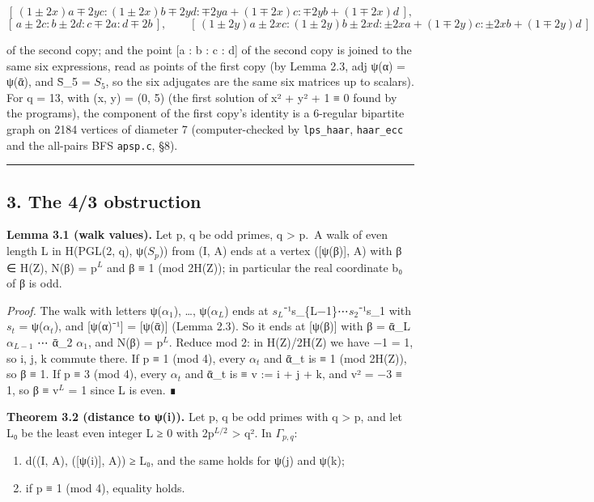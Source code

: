\documentclass[
  10pt,
]{article}
\providecommand{\tightlist}{%
  \setlength{\itemsep}{0pt}\setlength{\parskip}{0pt}}
\begin{document}
\[[\,(1 \pm 2x)a \mp 2yc : (1 \pm 2x)b \mp 2yd : \mp 2ya + (1 \mp 2x)c : \mp 2yb + (1 \mp 2x)d\,],\]
\[[\,a \pm 2c : b \pm 2d : c \mp 2a : d \mp 2b\,],\qquad
[\,(1 \pm 2y)a \pm 2xc : (1 \pm 2y)b \pm 2xd : \pm 2xa + (1 \mp 2y)c : \pm 2xb + (1 \mp 2y)d\,]\]

of the second copy; and the point {[}a : b : c : d{]} of the second copy
is joined to the same six expressions, read as points of the first copy
(by Lemma 2.3, adj ψ(α) = ψ(ᾱ), and S̄\_5 = \(S_{5}\), so the six
adjugates are the same six matrices up to scalars). For q = 13, with (x,
y) = (0, 5) (the first solution of x² + y² + 1 ≡ 0 found by the
programs), the component of the first copy's identity is a 6-regular
bipartite graph on 2184 vertices of diameter 7 (computer-checked by
\texttt{lps\_haar}, \texttt{haar\_ecc} and the all-pairs BFS
\texttt{apsp.c}, §8).

\begin{center}\rule{0.5\linewidth}{0.5pt}\end{center}

\hypertarget{the-43-obstruction}{%
\subsection{3. The 4/3 obstruction}\label{the-43-obstruction}}

\textbf{Lemma 3.1 (walk values).} Let p, q be odd primes, q
\textgreater{} p.~A walk of even length L in H(PGL(2, q), ψ(\(S_{p}\)))
from (I, A) ends at a vertex ({[}ψ(β){]}, A) with β ∈ H(Z), N(β) =
p\(^{L}\) and β ≡ 1 (mod 2H(Z)); in particular the real coordinate b₀ of
β is odd.

\emph{Proof.} The walk with letters ψ(\(α_{1}\)), \ldots, ψ(\(α_{L}\))
ends at \(s_{L}\)⁻¹s\_\{L−1\}⋯\(s_{2}\)⁻¹s\_1 with \(s_{t}\) =
ψ(\(α_{t}\)), and {[}ψ(α)⁻¹{]} = {[}ψ(ᾱ){]} (Lemma 2.3). So it ends at
{[}ψ(β){]} with β = ᾱ\_L \(α_{L−1}\) ⋯ ᾱ\_2 \(α_{1}\), and N(β) =
p\(^{L}\). Reduce mod 2: in H(Z)/2H(Z) we have −1 = 1, so i, j, k
commute there. If p ≡ 1 (mod 4), every \(α_{t}\) and ᾱ\_t is ≡ 1 (mod
2H(Z)), so β ≡ 1. If p ≡ 3 (mod 4), every \(α_{t}\) and ᾱ\_t is ≡ v := i
+ j + k, and v² = −3 ≡ 1, so β ≡ v\(^{L}\) = 1 since L is even. ∎

\textbf{Theorem 3.2 (distance to ψ(i)).} Let p, q be odd primes with q
\textgreater{} p, and let L₀ be the least even integer L ≥ 0 with
2p\(^{L/2}\) \textgreater{} q². In \(Γ_{p,q}\):

\begin{enumerate}
\def\labelenumi{(\alph{enumi})}
\tightlist
\item
  d((I, A), ({[}ψ(i){]}, A)) ≥ L₀, and the same holds for ψ(j) and ψ(k);
\item
  if p ≡ 1 (mod 4), equality holds.
\end{enumerate}
\end{document}
